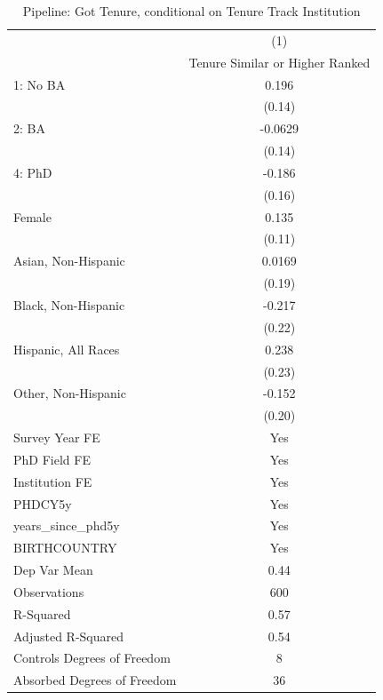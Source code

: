 \begin{table}[htbp]\centering
\def\sym#1{\ifmmode^{#1}\else\(^{#1}\)\fi}
\caption{Pipeline: Got Tenure, conditional on Tenure Track Institution}
\begin{tabular}{l*{1}{c}}
\hline\hline
  &\multicolumn{1}{c}{(1)}\\
  &\multicolumn{1}{c}{Tenure Similar or Higher Ranked}\\
\hline
1: No BA&       0.196         \\
  &      (0.14)         \\
[1em]
2: BA&     -0.0629         \\
  &      (0.14)         \\
[1em]
4: PhD&      -0.186         \\
  &      (0.16)         \\
[1em]
Female&       0.135         \\
  &      (0.11)         \\
[1em]
Asian, Non-Hispanic&      0.0169         \\
  &      (0.19)         \\
[1em]
Black, Non-Hispanic&      -0.217         \\
  &      (0.22)         \\
[1em]
Hispanic, All Races&       0.238         \\
  &      (0.23)         \\
[1em]
Other, Non-Hispanic&      -0.152         \\
  &      (0.20)         \\
[1em]
Survey Year FE&         Yes         \\
[1em]
PhD Field FE&         Yes         \\
[1em]
Institution FE&         Yes         \\
[1em]
PHDCY5y&         Yes         \\
[1em]
years\_since\_phd5y&         Yes         \\
[1em]
BIRTHCOUNTRY&         Yes         \\
\hline
Dep Var Mean&        0.44         \\
Observations&         600         \\
R-Squared&        0.57         \\
Adjusted R-Squared&        0.54         \\
Controls Degrees of Freedom&           8         \\
Absorbed Degrees of Freedom&          36         \\

\end{tabular}
\end{table}
